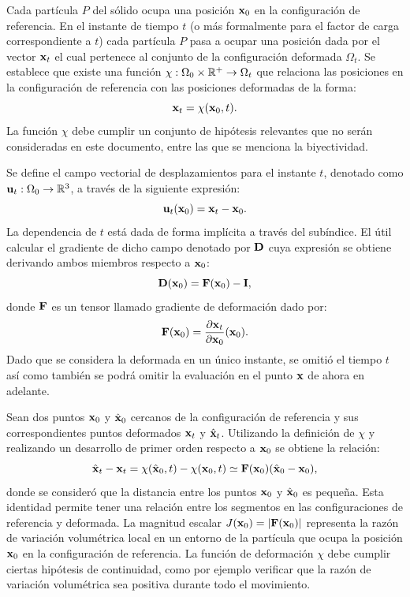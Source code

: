 Cada partícula $P$ del sólido ocupa una posición ${\bf x}_0$ en la configuración de referencia. %
%
En el instante de tiempo $t$ (o más formalmente para el factor de carga correspondiente a $t$) cada partícula $P$ pasa a ocupar una posición dada por el vector ${\bf x}_t$ el cual pertenece al conjunto de la configuración deformada $\Omega_t$. %
%
Se establece que existe una función $\chi:\Omega_0\times {\mathbb R}^+ \rightarrow \Omega_t$ que relaciona las posiciones en la configuración de referencia con las posiciones deformadas de la forma:
%
\begin{equation}
{\bf x}_t = \chi({\bf x}_0,t).
\end{equation}
%
La función $\chi$ debe cumplir un conjunto de hipótesis relevantes que no serán consideradas en este documento, entre las que se menciona la biyectividad. %


%
Se define el campo vectorial de desplazamientos para el instante $t$, denotado como ${\bf u}_t:\Omega_0\rightarrow {\mathbb R}^3$, a través de la siguiente expresión:
%
\begin{equation}
{\bf u}_t({\bf x}_0) = {\bf x}_t - {\bf x}_0.
\end{equation}
%
La dependencia de $t$ está dada de forma implícita a través del subíndice. %
%
El útil calcular el gradiente de dicho campo denotado por ${\bf D}$ cuya expresión se obtiene derivando ambos miembros respecto a ${\bf x}_0$:  
%
\begin{equation}\label{eqn:eqF}
{\bf D} ({\bf x}_0) = {\bf F}({\bf x}_0) - {\bf I},
\end{equation}
%
donde ${\bf F}$ es un tensor llamado gradiente de deformación dado por:
%
\begin{equation}\nonumber
{\bf F}({\bf x}_0) = \dfrac{\partial {\bf x}_t}{\partial {\bf x}_0}({\bf x}_0).
\end{equation}
%
%
Dado que se considera la deformada en un único instante, se omitió el tiempo $t$ así como también se podrá omitir la evaluación en el punto ${\bf x}$ de ahora en adelante. %



Sean dos puntos ${\bf x}_0$ y $\hat{{\bf x}}_0$ cercanos de la configuración de referencia y sus correspondientes puntos deformados ${\bf x}_t$ y $\hat{{\bf x}}_t$. %
%
Utilizando la definición de $\chi$ y realizando un desarrollo de primer orden respecto a ${\bf x}_0$ se obtiene la relación:
% 
\begin{equation} \label{eqn:relchi}
\hat{{\bf x}}_t - {\bf x}_t = \chi(\hat{{\bf x}}_0,t) - \chi({\bf x}_0,t) \simeq {\bf F}({\bf x}_0)(\hat{{\bf x}}_0-{\bf x}_0),
\end{equation}
%
donde se consideró que la distancia entre los puntos ${\bf x}_0$ y $\hat{{\bf x}}_0$ es pequeña. %
%
Esta identidad permite tener una relación entre los segmentos en las configuraciones de referencia y deformada.
%
La magnitud escalar $J({\bf x}_0) = |{\bf F}({\bf x}_0)|$ representa la razón de variación volumétrica local en un entorno de la partícula que ocupa la posición ${\bf x}_0$ en la configuración de referencia. %
%
La función de deformación $\chi$ debe cumplir ciertas hipótesis de continuidad, como por ejemplo verificar que la razón de variación volumétrica sea positiva durante todo el movimiento. %
%


